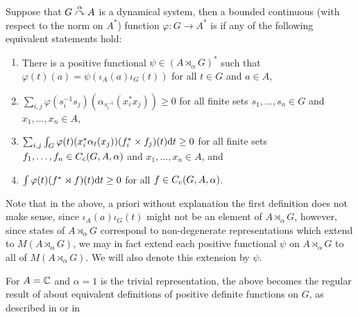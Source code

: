 \begin{definition}
	Suppose that $G \stackrel{\alpha}{\curvearrowright} A$ is a dynamical system, then a bounded continuous (with respect to the norm on $A^*$) function $\varphi \colon G \to A^*$ is  if any of the following equivalent statements hold:
	\begin{enumerate}
		\item There is a positive functional $\psi \in (A \rtimes_\alpha G)^*$ such that $\varphi(t)(a) = \psi(\iota_A(a) \iota_G(t))$ for all $t \in G$ and $a \in A$,
		\item $\sum_{i,j} \varphi (s_i^{-1}s_j)(\alpha_{s_{i}^{-1}}(x_{i}^* x_{j})) \geq 0 $ for all finite sets $s_1,\dots,s_n \in G$ and $x_1,\dots,x_n \in A$,
		\item $\sum_{i,j}\int_G \varphi(t)(x_{i}^*\alpha_t(x_j))(f_i^* \times f_j)(t) \mathrm{d} t \geq 0$ for all finite sets $f_1,\dots,f_n \in C_c(G,A,\alpha)$ and $x_1,\dots,x_n \in A$, and
		\item $\int \varphi(t)(f^* \rtimes f)(t) \mathrm{d} t \geq 0$ for all $f \in C_c(G,A,\alpha)$.
	\end{enumerate}
\end{definition}
\begin{remark}
	Note that in the above, a priori without explanation the first definition does not make sense, since $\iota_A(a) \iota_G(t)$ might not be an element of $A \rtimes_\alpha G$, however, since states of $A \rtimes_\alpha G$ correspond to non-degenerate representations which extend to $M(A \rtimes_\alpha G)$, we may in fact extend each positive functional $\psi$ on $A \rtimes_\alpha G$ to all of $M(A \rtimes_\alpha G)$. We will also denote this extension by $\psi$. 
\end{remark}
For $A = \mathbb{C}$ and $\alpha = 1$ is the trivial representation, the above becomes the regular result of about equivalent definitions of positive definite functions on $G$, as described in \cite{folland2016fourier} or in \cite{pedersenalgauto} 

